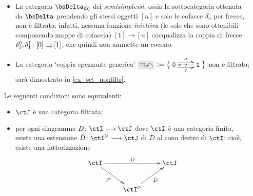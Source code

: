 \begin{examples}
\begin{itemize}
  \item La categoria \(\bsDelta_\text{inj}\) dei \emph{semisimplessi}, ossia la sottocategoria ottenuta da \(\bsDelta\) prendendo gli stessi oggetti \([n]\) e solo le cofacce \(\delta_n^i\) per frecce, non è filtrata: infatti, nessuna funzione \emph{iniettiva} (le sole che sono ottenibili componendo mappe di cofaccia) \([1] \to [n]\) coequalizza la coppia di frecce \(\delta_1^0,\delta_1^1 \colon [0]\rightrightarrows [1]\), che quindi non ammette un cocono.
  \item La categoria `coppia spezzante generica' \(\genRG\defeq\big\{\xymatrix{\texttt{0} \ar@<.4em>[r]^-\sigma\ar@<-.4em>[r]_-\tau & \texttt{1}\ar[l]|j}\big\}\) non è filtrata; sarà dimostrato in \ref{ex_set_nonfiltr}.
 \end{itemize}
\end{examples}
\begin{theorem}\label{estensione_filtrata}
 Le seguenti condizioni sono equivalenti:
 \begin{itemize}
  \item \(\ctJ\) è una categoria filtrata;
  \item per ogni diagramma \(D \colon \ctI \fun\ctJ\) dove \(\ctI\) è una categoria finita, esiste una estensione \(\bar D \colon \ctI^\rhd \fun \ctJ\) di \(D\) al cono destro di \(\ctI\): cioè, esiste una fattorizzazione
        \[\xymatrix{
         \ctI \ar[rr]^D \ar[dr]_-{i^\rhd} && \ctJ \\
         & \ctI^\rhd\ar[ur]_-{\bar D}
         }\]
 \end{itemize}
\end{theorem}
